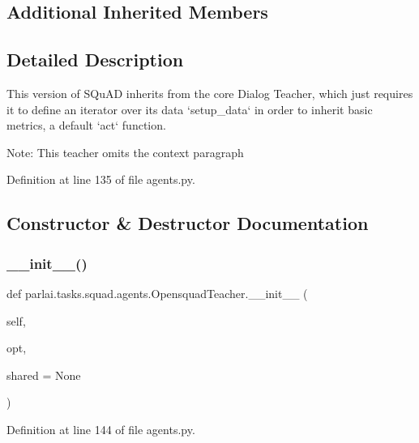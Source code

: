 \subsection*{Additional Inherited Members}


\subsection{Detailed Description}
\begin{DoxyVerb}This version of SQuAD inherits from the core Dialog Teacher, which just requires it
to define an iterator over its data `setup_data` in order to inherit basic metrics,
a default `act` function.

Note: This teacher omits the context paragraph
\end{DoxyVerb}
 

Definition at line 135 of file agents.\+py.



\subsection{Constructor \& Destructor Documentation}
\mbox{\label{classparlai_1_1tasks_1_1squad_1_1agents_1_1OpensquadTeacher_a1b05b43517db8f76098f6901d2b7516b}} 
\subsubsection{\texorpdfstring{\+\_\+\+\_\+init\+\_\+\+\_\+()}{\_\_init\_\_()}}
{\footnotesize\ttfamily def parlai.\+tasks.\+squad.\+agents.\+Opensquad\+Teacher.\+\_\+\+\_\+init\+\_\+\+\_\+ (\begin{DoxyParamCaption}\item[{}]{self,  }\item[{}]{opt,  }\item[{}]{shared = {\ttfamily None} }\end{DoxyParamCaption})}



Definition at line 144 of file agents.\+py.


